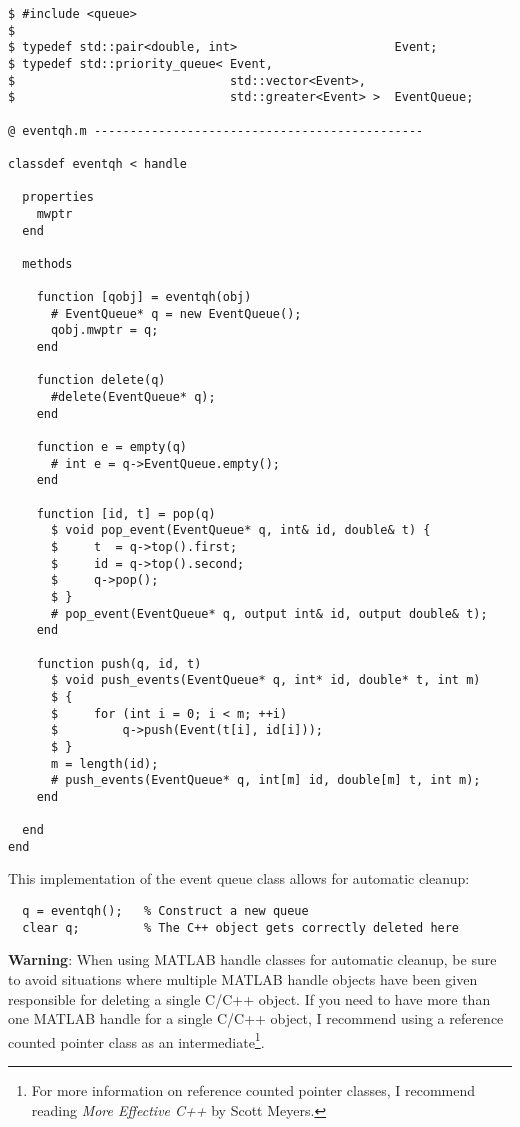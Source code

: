 \documentclass[12pt]{article}
\begin{document}
\begin{verbatim}
$ #include <queue>
$
$ typedef std::pair<double, int>                      Event;
$ typedef std::priority_queue< Event,
$                              std::vector<Event>,
$                              std::greater<Event> >  EventQueue;

@ eventqh.m ----------------------------------------------

classdef eventqh < handle

  properties
    mwptr
  end

  methods

    function [qobj] = eventqh(obj)
      # EventQueue* q = new EventQueue();
      qobj.mwptr = q;
    end

    function delete(q)
      #delete(EventQueue* q);
    end

    function e = empty(q)
      # int e = q->EventQueue.empty();
    end

    function [id, t] = pop(q)
      $ void pop_event(EventQueue* q, int& id, double& t) {
      $     t  = q->top().first;
      $     id = q->top().second;
      $     q->pop();
      $ }
      # pop_event(EventQueue* q, output int& id, output double& t);
    end

    function push(q, id, t)
      $ void push_events(EventQueue* q, int* id, double* t, int m)
      $ {
      $     for (int i = 0; i < m; ++i)
      $         q->push(Event(t[i], id[i]));
      $ }
      m = length(id);
      # push_events(EventQueue* q, int[m] id, double[m] t, int m);
    end

  end
end
\end{verbatim}

This implementation of the event queue class allows for automatic cleanup:
\begin{verbatim}
  q = eventqh();   % Construct a new queue
  clear q;         % The C++ object gets correctly deleted here
\end{verbatim}

{\bf Warning}: When using MATLAB handle classes for automatic cleanup,
be sure to avoid situations where multiple MATLAB handle objects have
been given responsible for deleting a single C/C++ object.  If you need
to have more than one MATLAB handle for a single C/C++ object,
I recommend using a reference counted pointer class as an 
intermediate\footnote{
  For more information on reference counted pointer classes, I recommend
  reading {\em More Effective C++} by Scott Meyers.
}.
\end{document}
